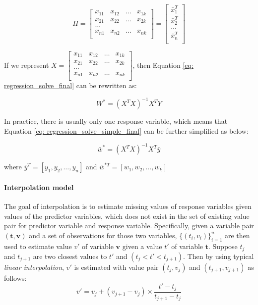 \begin{equation}
    H=\begin{bmatrix}
x_{11} & x_{12} &\dots &x_{1k}\\
x_{21} & x_{22} &\dots &x_{2k}\\
\dots\\
x_{n1} & x_{n2} &\dots &x_{nk}\\
\end{bmatrix}
=\begin{bmatrix}
\bar{x}_1^T\\
\bar{x}_2^T\\
\dots\\
\bar{x}_n^T\\
\end{bmatrix}
\end{equation}

If we represent $X = \begin{bmatrix}
x_{11} & x_{12} &\dots &x_{1k}\\
x_{21} & x_{22} &\dots &x_{2k}\\
\dots\\
x_{n1} & x_{n2} &\dots &x_{nk}\\
\end{bmatrix}$, then Equation \ref{eq: regression_solve_final} can be rewritten as:

\begin{equation}\label{eq: regression_solve_simple_final}
    W^*=(X^TX)^{-1}X^TY
\end{equation}

In practice, there is usually only one response variable, which means that Equation \ref{eq: regression_solve_simple_final} can be further simplified as below:

\begin{equation}\label{eq: regression_solve_simple_final_simple}
    \bar{w}^*=(X^TX)^{-1}X^T\bar{y}
\end{equation}

where $\bar{y}^T = [y_1,y_2,\dots,y_n]$ and $\bar{w}^{*T} =[w_1,w_2,\dots,w_k]$

\paragraph{Interpolation model} 

The goal of interpolation is to estimate missing values of response variables given values of the predictor variables, which does not exist in the set of existing value pair for predictor variable and response variable. Specifically, given a variable pair $(\textbf{t},\textbf{v})$ and a set of observations for those two variables, $\{(t_i, v_i)\}_{i=1}^n$ are then used to estimate value $v'$ of variable $\textbf{v}$ given a value $t'$ of variable $\textbf{t}$. Suppose $t_j$ and $t_{j+1}$ are two closest values to $t'$ and $(t_j< t' < t_{j+1})$. Then by using typical {\em linear interpolation}, $v'$ is estimated with value pair $(t_j, v_j)$ and $(t_{j+1}, v_{j+1})$ as follows:
\begin{equation}\label{eq: interpolation}
    v'= v_j + (v_{j+1}-v_j)\times\frac{t'-t_j}{t_{j+1}-t_j}
\end{equation}




